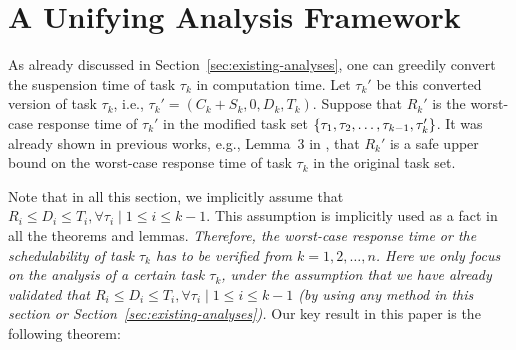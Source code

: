 \section{A Unifying Analysis Framework}
\label{sec:analysis}


As already discussed in Section~\ref{sec:existing-analyses}, one can greedily convert the suspension time of task $\tau_k$ in computation time. Let $\tau_k'$ be this converted version of task $\tau_k$, i.e., $\tau_k' = (C_k + S_k, 0, D_k, T_k)$.  Suppose that $R_k'$ is the worst-case response time of $\tau_k'$ in the modified task set $\left\{{\tau_1, \tau_2, \ldots, \tau_{k-1}, \tau_k'}\right\}$. It was already shown in previous works, e.g., Lemma~3 in
\cite{Liu_2014}, that $R_k'$ is a safe upper bound on the worst-case response time of task $\tau_k$ in the original task set.

Note that in all this section, we implicitly assume that $R_i
\leq D_i \leq T_i, \forall \tau_i \mid 1 \leq i \leq k-1$.  This assumption is implicitly used as a fact in all the theorems and lemmas. \emph{Therefore, the worst-case response time or the schedulability of task $\tau_k$ has to be verified from $k=1,2,\ldots, n$. Here we only focus on the analysis of a certain task $\tau_k$, under the assumption that we have already validated that $R_i
\leq D_i \leq T_i, \forall \tau_i \mid 1 \leq i \leq k-1$ (by using any method in this section or Section~\ref{sec:existing-analyses}). } 
Our key result in
this paper is the following theorem:

